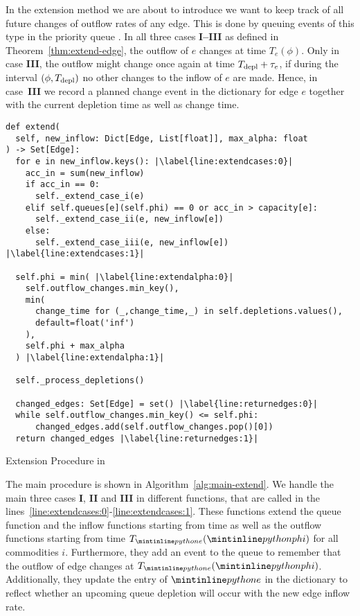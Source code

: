 In the extension method we are about to introduce we want to keep track of all future changes of outflow rates of any edge.
This is done by queuing events of this type in the priority queue .
In all three cases \textbf{I--III} as defined in Theorem~\ref{thm:extend-edge}, the outflow of $e$ changes at time $T_e(\phi)$.
Only in case \textbf{III}, the outflow might change once again at time $T_{\textnormal{depl}} + \tau_e$, if during the interval $(\phi, T_{\textnormal{depl}})$ no other changes to the inflow of $e$ are made.
Hence, in case~\textbf{III} we record a planned change event in the dictionary  for edge $e$ together with the current depletion time as well as change time.

\begin{algorithm}[ht]
    \begin{verbatim}
def extend(
  self, new_inflow: Dict[Edge, List[float]], max_alpha: float
) -> Set[Edge]:
  for e in new_inflow.keys(): |\label{line:extendcases:0}|
    acc_in = sum(new_inflow)
    if acc_in == 0:
      self._extend_case_i(e)
    elif self.queues[e](self.phi) == 0 or acc_in > capacity[e]:
      self._extend_case_ii(e, new_inflow[e])
    else:
      self._extend_case_iii(e, new_inflow[e]) |\label{line:extendcases:1}|

  self.phi = min( |\label{line:extendalpha:0}|
    self.outflow_changes.min_key(),
    min(
      change_time for (_,change_time,_) in self.depletions.values(),
      default=float('inf')
    ),
    self.phi + max_alpha
  ) |\label{line:extendalpha:1}|

  self._process_depletions()
    
  changed_edges: Set[Edge] = set() |\label{line:returnedges:0}|
  while self.outflow_changes.min_key() <= self.phi:
      changed_edges.add(self.outflow_changes.pop()[0])
  return changed_edges |\label{line:returnedges:1}|

    \end{verbatim}
    \caption{Extension Procedure in }
    \label{alg:main-extend}
\end{algorithm}


The main procedure is shown in Algorithm~\ref{alg:main-extend}.
We handle the main three cases \textbf{I}, \textbf{II} and \textbf{III} in different functions, that are called in the  lines~\ref{line:extendcases:0}-\ref{line:extendcases:1}.
These functions extend the queue function  and the inflow functions  starting from time  as well as the outflow functions  starting from time $T_{\code{e}}(\code{phi})$ for all commodities $i$.
Furthermore, they add an event to the queue  to remember that the outflow of edge  changes at $T_{\code{e}}(\code{phi})$.
Additionally, they update the entry of $\code{e}$ in the dictionary  to reflect whether an upcoming queue depletion will occur with the new edge inflow rate.


